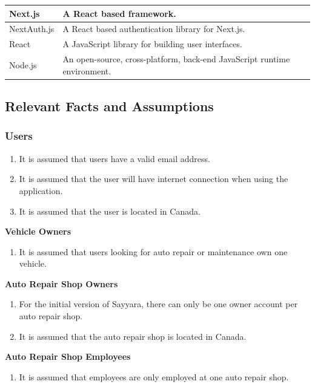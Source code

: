 \documentclass[12pt]{article}
\begin{document}
\begin{table}[H]
\begin{tabular}{ |p{5cm}|p{10.5cm}|  }
		\hline
		Next.js                               & A React based framework.                                                 \\
		\hline
		NextAuth.js                           & A React based authentication library for Next.js.                        \\
		\hline
		React                                 & A JavaScript library for building user interfaces.                       \\
		\hline
		Node.js                               & An open-source, cross-platform, back-end JavaScript runtime environment. \\
		\hline
	\end{tabular}
\end{table}

\subsection{Relevant Facts and Assumptions}
\subsubsection{Users}
\begin{enumerate}
	\item It is assumed that users have a valid email address.
	\item It is assumed that the user will have internet connection when using the application.
	\item It is assumed that the user is located in Canada.
\end{enumerate}

\textbf{Vehicle Owners}
\begin{enumerate}
	\item It is assumed that users looking for auto repair or maintenance own one vehicle.
\end{enumerate}

\textbf{Auto Repair Shop Owners}
\begin{enumerate}
	\item For the initial version of Sayyara, there can only be one owner account per auto repair shop.
	\item It is assumed that the auto repair shop is located in Canada.
\end{enumerate}

\textbf{Auto Repair Shop Employees}
\begin{enumerate}
	\item It is assumed that employees are only employed at one auto repair shop.
\end{enumerate}
\end{document}
